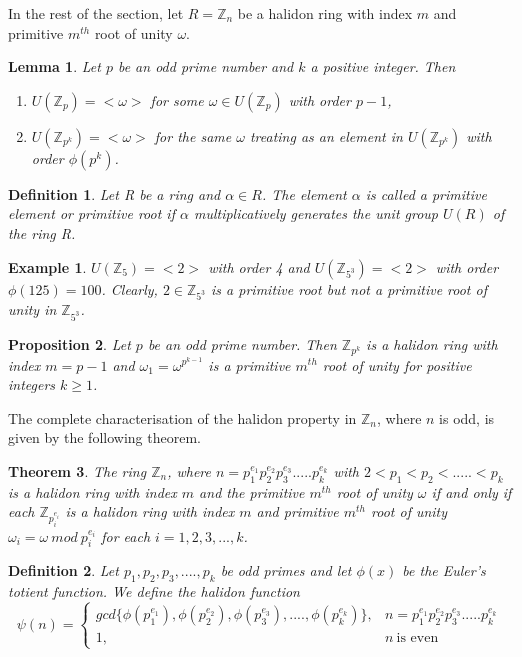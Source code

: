 \documentclass[sn-mathphys,Numbered]{sn-jnl}%
\theoremstyle{thmstyleone}
\newtheorem{theorem}{Theorem}
\newtheorem{proposition}[theorem]{Proposition}
\theoremstyle{thmstyletwo}
\newtheorem{example}{Example}
\theoremstyle{thmstylethree}
\newtheorem{definition}{Definition}
\newtheorem{lemma}[theorem]{Lemma}
\begin{document}
In the rest of the section, let $R=\mathbb{Z}_{n}$ be a halidon ring with index $m$ and primitive $m^{th}$ root of unity $\omega$.
\begin{lemma} \label{rd3}
Let $p$ be an odd prime number and $k$ a positive integer. Then
\begin{enumerate}
  \item $U(\mathbb{Z}_{p})=<\omega>$ for some $\omega \in U(\mathbb{Z}_{p})$ with order $p-1$,
  \item $U(\mathbb{Z}_{p^{k}})=<\omega>$ for the same $\omega$ treating as an element in  $U(\mathbb{Z}_{p^{k}})$ with order $\phi(p^{k})$.
\end{enumerate}
\end{lemma}
\begin{definition}
Let R be a ring and $\alpha \in R$. The element $\alpha$ is called a \textit{primitive element} or \textit{primitive root} if $\alpha$ multiplicatively generates the unit group $U(R)$
 of the ring R.
\end{definition}
\begin{example}
$U(\mathbb{Z}_{5})=<2>$ with order 4  and $U(\mathbb{Z}_{5^{3}})=<2>$ with order $\phi(125)=100$. Clearly, $2 \in \mathbb{Z}_{5^{3}}$ is a primitive root but not a primitive root of unity in $\mathbb{Z}_{5^{3}}$.
\end{example}
\begin{proposition}  \label{rd17}
Let $p$ be an odd prime number. Then $\mathbb{Z}_{p^{k}}$ is a halidon ring with index $m=p-1$ and  $\omega_{1}=\omega^{p^{k-1}}$ is a primitive $m^{th}$ root of unity for positive integers $k\geq 1$.
\end{proposition}
The complete characterisation of the halidon property in $\mathbb{Z}_{n}$, where $n$ is odd, is given by the following theorem.
\begin{theorem}\label{rd18}
The ring $\mathbb{Z}_{n}$, where $ \displaystyle n=p_{1}^{e_{1}}p_{2}^{e_{2}}p_{3}^{e_{3}}.....p_{k}^{e_{k}}$ with $2<p_{1}<p_{2}<.....<p_{k}$ is a halidon ring with index $m$ and the primitive $m^{th}$ root of unity $\omega$ if and only if each $ \displaystyle \mathbb{Z}_{p_{i}^{e_{i}}}$ is a halidon ring with index $m$ and primitive $m^{th}$ root of unity $ \displaystyle \omega_{i}=\omega \ mod \ {p_{i}^{e_{i}}} $ for each $i=1,2,3,...,k$.
\end{theorem}
\begin{definition} \label{rd7}
Let $p_{1},p_{2},p_{3},....,p_{k}$ be odd primes and let $\phi(x)$ be the Euler's totient function. We define the \textit{halidon function}  $$\psi(n)= \begin{cases} gcd \{ \phi(p_{1}^{e_{1}}), \phi(p_{2}^{e_{2}}),\phi(p_{3}^{e_{3}}),...., \phi(p_{k}^{e_{k}})\}, & n=p_{1}^{e_{1}}p_{2}^{e_{2}}p_{3}^{e_{3}}.....p_{k}^{e_{k}} \\
1, & n \ \text{is even}\end{cases} $$
\end{definition}
\end{document}
